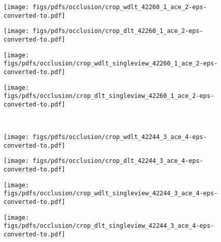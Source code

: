 \documentclass[runningheads]{llncs}
\begin{document}
\begin{figure*}
    \centering
    
    \begin{subfigure}[b]{0.24\linewidth}        \centering
        \texttt{[image: figs/pdfs/occlusion/crop\_wdlt\_42260\_1\_ace\_2-eps-converted-to.pdf]}
    \end{subfigure}
    \begin{subfigure}[b]{0.24\linewidth}        \centering
        \texttt{[image: figs/pdfs/occlusion/crop\_dlt\_42260\_1\_ace\_2-eps-converted-to.pdf]}
    \end{subfigure}
    \begin{subfigure}[b]{0.24\linewidth}        \centering
        \texttt{[image: figs/pdfs/occlusion/crop\_wdlt\_singleview\_42260\_1\_ace\_2-eps-converted-to.pdf]}
    \end{subfigure}
    \begin{subfigure}[b]{0.24\linewidth}        \centering
        \texttt{[image: figs/pdfs/occlusion/crop\_dlt\_singleview\_42260\_1\_ace\_2-eps-converted-to.pdf]}

    \end{subfigure} \\   \vspace{1mm}
        
    
    \begin{subfigure}[b]{0.24\linewidth}        \centering
        \texttt{[image: figs/pdfs/occlusion/crop\_wdlt\_42244\_3\_ace\_4-eps-converted-to.pdf]}
    \end{subfigure}
    \begin{subfigure}[b]{0.24\linewidth}        \centering
        \texttt{[image: figs/pdfs/occlusion/crop\_dlt\_42244\_3\_ace\_4-eps-converted-to.pdf]}
    \end{subfigure}
    \begin{subfigure}[b]{0.24\linewidth}        \centering
        \texttt{[image: figs/pdfs/occlusion/crop\_wdlt\_singleview\_42244\_3\_ace\_4-eps-converted-to.pdf]}
    \end{subfigure}
    \begin{subfigure}[b]{0.24\linewidth}        \centering
        \texttt{[image: figs/pdfs/occlusion/crop\_dlt\_singleview\_42244\_3\_ace\_4-eps-converted-to.pdf]}
    \end{subfigure} \\ \vspace{1mm}
    

\end{figure*}
\end{document}
